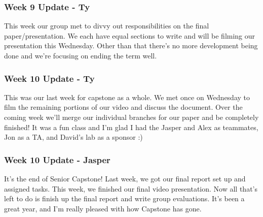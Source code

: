 \subsubsection{Week 9 Update - Ty}
This week our group met to divvy out responsibilities on the final paper/presentation.
We each have equal sections to write and will be filming our presentation this Wednesday.
Other than that there's no more development being done and we're focusing on ending the term well.

\subsubsection{Week 10 Update - Ty}
This was our last week for capstone as a whole.
We met once on Wednesday to film the remaining portions of our video and discuss the document.
Over the coming week we'll merge our individual branches for our paper and be completely finished!
It was a fun class and I'm glad I had the Jasper and Alex as teammates, Jon as a TA, and David's lab as a sponsor :) ​

\subsubsection{Week 10 Update - Jasper}
It's the end of Senior Capstone!
Last week, we got our final report set up and assigned tasks.
This week, we finished our final video presentation.
Now all that's left to do is finish up the final report and write group evaluations.
It's been a great year, and I'm really pleased with how Capstone has gone.
